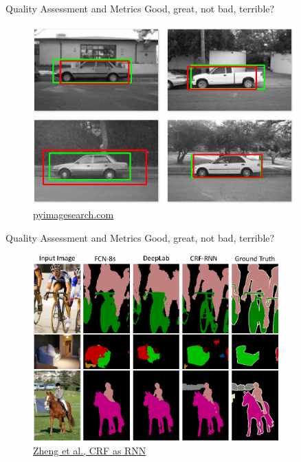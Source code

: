 \documentclass[handout]{beamer}
\begin{document}
\begin{frame}{Quality Assessment and Metrics}
Good, great, not bad, terrible?
\begin{figure}
\centering
\includegraphics[width=0.9\textwidth]{../media/iou_car_bbs.jpg}
\caption{\href{http://www.pyimagesearch.com/2016/11/07/intersection-over-union-iou-for-object-detection/}{\color{blue}pyimagesearch.com}}
\end{figure}
\end{frame}

\begin{frame}{Quality Assessment and Metrics}
Good, great, not bad, terrible?
\begin{figure}
\centering
\includegraphics[width=0.85\textwidth]{../media/CRFasRNN.png}
\caption{\href{http://www.robots.ox.ac.uk/~szheng/CRFasRNN.html}{\color{blue}Zheng et al., CRF as RNN}}
\end{figure}
\end{frame}
\end{document}
